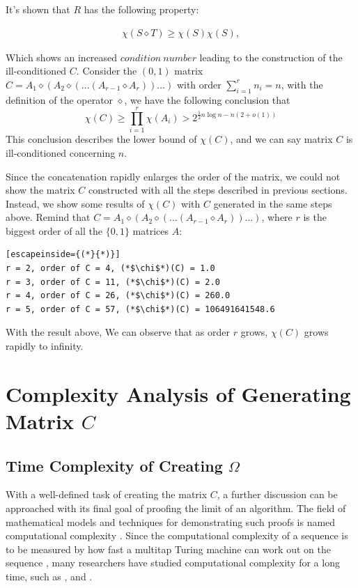 \documentclass[11pt]{article}
\begin{document}
It's shown that $R$ has the following property:

\begin{align*}
\chi(S \diamond T) \geq \chi(S)\chi(S),
\end{align*}

Which shows an increased $condition\ number$ leading to the construction of the ill-conditioned $C$. Consider the $(0, 1)$ matrix $C = A_1 \diamond (A_2 \diamond (. . . (A_{r-1} \diamond A_r))...)$ with order $\sum_{i=1}^rn_i=n$, with the definition of the operator $\diamond$, we have the following conclusion that
$$\chi(C)\geq \prod_{i=1}^r\chi(A_i) > 2^{\frac{1}{2}n\log n-n(2+o(1))}$$
This conclusion describes the lower bound of $\chi(C)$, and we can say matrix $C$ is ill-conditioned concerning $n$.

Since the concatenation rapidly enlarges the order of the matrix, we could not show the matrix $C$ constructed with all the steps described in previous sections. Instead, we show some results of $\chi(C)$ with $C$ generated in the same steps above. Remind that $C = A_1 \diamond (A_2 \diamond (. . . (A_{r-1} \diamond A_r))...)$, where $r$ is the biggest order of all the $\{0, 1\}$ matrices $A$:

\begin{lstlisting}[escapeinside={(*}{*)}]
r = 2, order of C = 4, (*$\chi$*)(C) = 1.0
r = 3, order of C = 11, (*$\chi$*)(C) = 2.0
r = 4, order of C = 26, (*$\chi$*)(C) = 260.0
r = 5, order of C = 57, (*$\chi$*)(C) = 106491641548.6
\end{lstlisting}

With the result above, We can observe that as order $r$ grows, $\chi(C)$ grows rapidly to infinity.

\section{Complexity Analysis of Generating Matrix $C$}
\subsection{Time Complexity of Creating $\Omega$}
With a well-defined task of creating the matrix $C$, a further discussion can be approached with its final goal of proofing the limit of an algorithm. The field of mathematical models and techniques for demonstrating such proofs is named computational complexity \cite{10.5555/1074100.1074233}. Since the computational complexity of a sequence is to be measured by how fast a multitap Turing machine can work out on the sequence \cite{hartmanis1965computational}, many researchers have studied computational complexity for a long time, such as \cite{papadimitriou2003computational}, \cite{du2011theory} and \cite{cook2007overview}.
\end{document}
